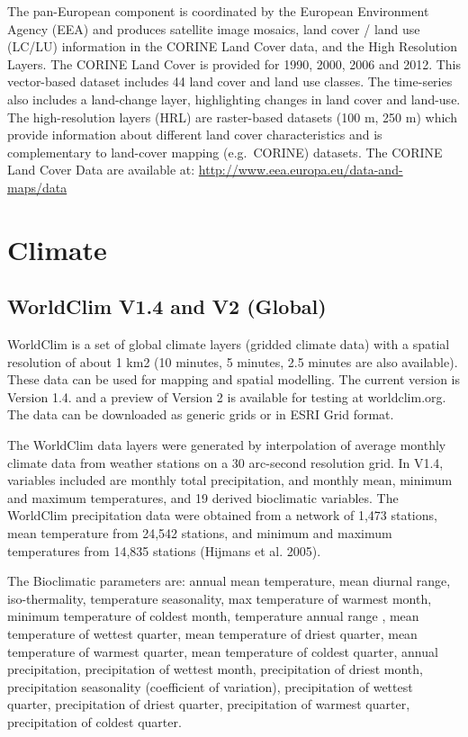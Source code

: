 \documentclass[]{book}
\theoremstyle{definition}
\theoremstyle{definition}
\theoremstyle{definition}
\theoremstyle{remark}
\begin{document}
The pan-European component is coordinated by the European Environment
Agency (EEA) and produces satellite image mosaics, land cover / land use
(LC/LU) information in the CORINE Land Cover data, and the High
Resolution Layers. The CORINE Land Cover is provided for 1990, 2000,
2006 and 2012. This vector-based dataset includes 44 land cover and land
use classes. The time-series also includes a land-change layer,
highlighting changes in land cover and land-use. The high-resolution
layers (HRL) are raster-based datasets (100 m, 250 m) which provide
information about different land cover characteristics and is
complementary to land-cover mapping (e.g.~CORINE) datasets. The CORINE
Land Cover Data are available at:
\url{http://www.eea.europa.eu/data-and-maps/data}

\section{Climate}\label{climate}

\subsection{WorldClim V1.4 and V2
(Global)}\label{worldclim-v1.4-and-v2-global}

WorldClim is a set of global climate layers (gridded climate data) with
a spatial resolution of about 1 km2 (10 minutes, 5 minutes, 2.5 minutes
are also available). These data can be used for mapping and spatial
modelling. The current version is Version 1.4. and a preview of Version
2 is available for testing at worldclim.org. The data can be downloaded
as generic grids or in ESRI Grid format.

The WorldClim data layers were generated by interpolation of average
monthly climate data from weather stations on a 30 arc-second resolution
grid. In V1.4, variables included are monthly total precipitation, and
monthly mean, minimum and maximum temperatures, and 19 derived
bioclimatic variables. The WorldClim precipitation data were obtained
from a network of 1,473 stations, mean temperature from 24,542 stations,
and minimum and maximum temperatures from 14,835 stations (Hijmans et
al. 2005).

The Bioclimatic parameters are: annual mean temperature, mean diurnal
range, iso-thermality, temperature seasonality, max temperature of
warmest month, minimum temperature of coldest month, temperature annual
range , mean temperature of wettest quarter, mean temperature of driest
quarter, mean temperature of warmest quarter, mean temperature of
coldest quarter, annual precipitation, precipitation of wettest month,
precipitation of driest month, precipitation seasonality (coefficient of
variation), precipitation of wettest quarter, precipitation of driest
quarter, precipitation of warmest quarter, precipitation of coldest
quarter.
\end{document}
